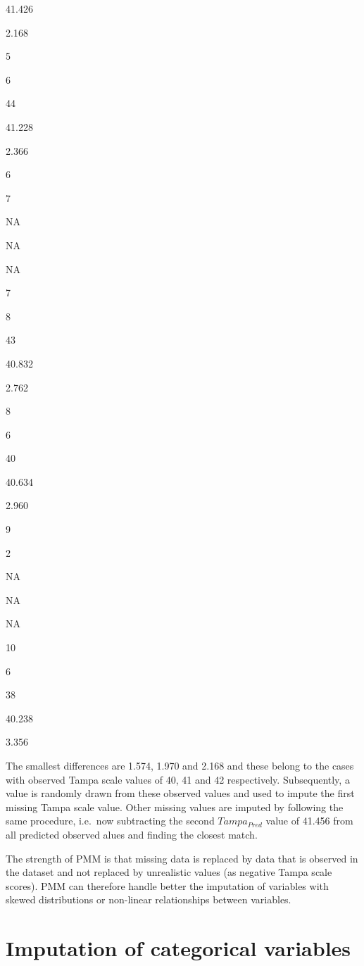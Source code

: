 \documentclass[
]{book}
\begin{document}
41.426

2.168

5

6

44

41.228

2.366

6

7

NA

NA

NA

7

8

43

40.832

2.762

8

6

40

40.634

2.960

9

2

NA

NA

NA

10

6

38

40.238

3.356

The smallest differences are 1.574, 1.970 and 2.168 and these belong to
the cases with observed Tampa scale values of 40, 41 and 42
respectively. Subsequently, a value is randomly drawn from these
observed values and used to impute the first missing Tampa scale value.
Other missing values are imputed by following the same procedure,
i.e.~now subtracting the second \(Tampa_{Pred}\) value of 41.456 from
all predicted observed alues and finding the closest match.

The strength of PMM is that missing data is replaced by data that is
observed in the dataset and not replaced by unrealistic values (as
negative Tampa scale scores). PMM can therefore handle better the
imputation of variables with skewed distributions or non-linear
relationships between variables.

\hypertarget{imputation-of-categorical-variables}{%
\section{Imputation of categorical
variables}\label{imputation-of-categorical-variables}}
\end{document}
